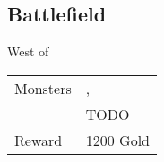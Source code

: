 \subsection{Battlefield}
\label{map:battlefield_15}

West of 

\noindent\begin{tabularx}{\textwidth}[l]{lX}
	Monsters
	& \nameref{monster:flazzard}, \nameref{monster:flazzard} \\
	& TODO
\\ \hline
	Reward & 1200 Gold
\end{tabularx}
